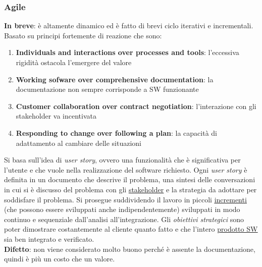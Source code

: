 			\subsubsection{Agile} 
			\textbf{In breve}: è altamente dinamico ed è fatto di brevi ciclo iterativi e incrementali. \\
			Basato su principi fortemente di reazione che sono:
				\begin{enumerate}
			 		\item \textbf{Individuals and interactions over processes and tools}: l’eccessiva rigidità ostacola l’emergere del valore
			 		\item \textbf{Working sofware over comprehensive documentation}: la documentazione non sempre corrisponde a SW funzionante
			 		\item \textbf{Customer collaboration over contract negotiation}: l’interazione con gli stakeholder va incentivata
			 		\item \textbf{Responding to change over following a plan}: la capacità di adattamento al cambiare delle situazioni
			 	\end{enumerate}
			Si basa sull'idea di \textit{user story}, ovvero una funzionalità che è significativa per l'utente e che vuole nella realizzazione del software richiesto.
			Ogni \textit{user story} è definita in un documento che descrive il problema, una sintesi delle conversazioni in cui si è discusso del problema con gli \underline{\hyperref[stakeholder]{stakeholder}} e la strategia da adottare per soddisfare il problema.
			Si prosegue suddividendo il lavoro in piccoli  \underline{\hyperref[incremento]{incrementi}} (che possono essere sviluppati anche indipendentemente) sviluppati in modo continuo e sequenziale dall'analisi all'integrazione.
			Gli \textit{obiettivi strategici} sono poter dimostrare costantemente al cliente quanto fatto e che l'intero  \underline{\hyperref[prodotto]{prodotto SW}} sia ben integrato e verificato. \\
		 	\textbf{Difetto}: non viene considerato molto buono perché è assente la documentazione, quindi è più un costo che un valore.

